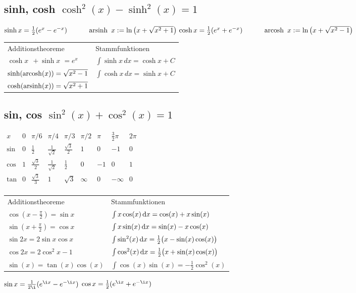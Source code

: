 \documentclass[german]{latex4ei/latex4ei_sheet}
\renewcommand{\diff}{\mathop{}\!\mathrm{\vphantom( d}}
\begin{document}
	\begin{sectionbox}
		\subsection{sinh, cosh \quad $\cosh^2(x)  - \sinh^2(x) = 1$}
			$\sinh x = \frac{1}{2}(e^x -e^{-x}) \qquad \quad \operatorname{arsinh}\ x:= \ln\left(x+\sqrt{x^2+1}\right) \\
			\cosh x  = \frac{1}{2}(e^x +e^{-x}) \qquad \quad \operatorname{arcosh}\ x:= \ln\left(x+\sqrt{x^2-1}\right)$

			\begin{tabular}{ll}
				Additionstheoreme &	Stammfunktionen \\
				$\cosh x \,\; + \sinh x \,\,= e^{x}$ & $\int \sinh x \, dx = \cosh x + C$\\
				$\sinh({\rm arcosh}(x)) = \sqrt{x^2 - 1}$ & $\int \cosh x \, dx = \sinh x + C $\\
				$\cosh({\rm arsinh}(x)) = \sqrt{x^2 + 1}$ 	
			\end{tabular}
		\subsection{sin, cos \quad $\sin^2(x)  + \cos^2(x) = 1$}
			$\begin{array}{c|c|c|c|c|c|c|c|c}
				x & 0 & \pi / 6 & \pi / 4 & \pi / 3 & \pi / 2 & \pi & \frac{3}{2}\pi & 2 \pi \\ \hline
				\sin & 0 & \frac{1}{2} & \frac{1}{\sqrt{2}} & \frac{\sqrt 3}{2} & 1 & 0 & -1 & 0 \\
				\cos & 1 & \frac{\sqrt 3}{2} & \frac{1}{\sqrt 2} & \frac{1}{2} & 0 & -1 & 0 & 1 \\     
				\tan & 0 & \frac{\sqrt{3}}{3}&	1				 &	\sqrt{3} & \infty & 0 & - \infty & 0\\
			\end{array}$ 
			\begin{tabular}{l  l} 
				Additionstheoreme &  Stammfunktionen\\
		 		$\cos (x - \frac{\pi}{2}) = \sin x$ & $\int x \cos(x) \diff x = \cos(x) + x \sin(x)$\\
				$\sin (x + \frac{\pi}{2}) = \cos x$ & $\int x \sin(x) \diff x = \sin(x) - x \cos(x)$\\
			 	$\sin 2x = 2 \sin x \cos x $  & $\int \sin^2(x) \diff x = \frac12 \bigl(x - \sin(x)\cos(x) \bigr)$\\
			 	$\cos 2x = 2\cos^2 x - 1$  & $\int \cos^2(x) \diff x = \frac12 \bigl(x + \sin(x)\cos(x) \bigr)$\\
		 		$\sin(x) = \tan(x)\cos(x)$ & $\int \cos(x)\sin(x) = -\frac12 \cos^2(x)$ \\
			\end{tabular}

			$\sin x = \frac{1}{2\i} ( e^{\i x} - e^{- \i x})$ \qquad $\cos x = \frac{1}{2}( e^{\i x} + e^{- \i x})$
	\end{sectionbox}
\end{document}
